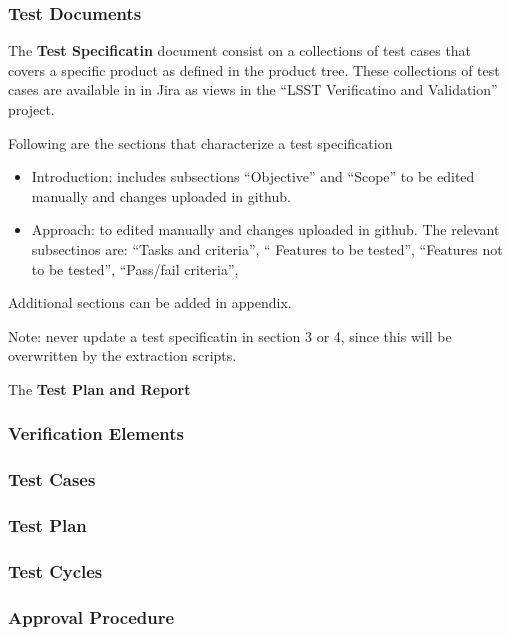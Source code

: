 \subsubsection{Test Documents}

The {\bf Test Specificatin} document consist on a collections of test cases that covers a specific \product{} product as defined in the product tree. These collections of test cases are available in in Jira as views in the ``LSST Verificatino and Validation'' project.

Following are the sections that characterize a test specification

\begin{itemize}
\item Introduction: includes subsections ``Objective'' and ``Scope'' to be edited manually and changes uploaded in github.
\item Approach: to edited manually and changes uploaded in github. The relevant subsectinos are: ``Tasks and criteria'', `` Features to be tested'', ``Features not to be tested'', ``Pass/fail criteria'', 
\end{itemize}

Additional sections can be added in appendix.

Note: never update a test specificatin in section 3 or 4, since this will be overwritten by the extraction scripts.

The {\bf Test Plan and Report}

\subsubsection{Verification Elements}

\subsubsection{Test Cases}

\subsubsection{Test Plan}

\subsubsection{Test Cycles}

\subsubsection{Approval Procedure}

